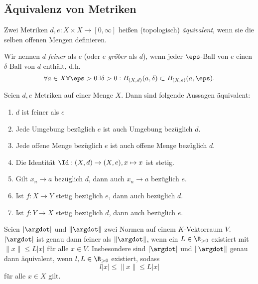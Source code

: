 \subsection{Äquivalenz von Metriken}

\begin{df}
	Zwei Metriken $d,e : X \times X \to [0, \infty]$ heißen (topologisch) \emph{äquivalent}, wenn sie die selben offenen Mengen definieren.

	Wir nennen $d$ \emph{feiner} als $e$ (oder $e$ \emph{gröber} als $d$), wenn jeder $\eps$-Ball von $e$ einen $\delta$-Ball von $d$ enthält, d.h.
	\[
		\forall a \in X \forall \eps > 0 \exists \delta > 0 : B_{(X,d)}(a, \delta) \subset B_{(X,e)}(a, \eps).
	\]
\end{df}

\begin{prop}
	Seien $d, e$ Metriken auf einer Menge $X$.
	Dann sind folgende Aussagen äquivalent:
	\begin{enumerate}[(1)]
		\item
			$d$ ist feiner als $e$
		\item
			Jede Umgebung bezüglich $e$ ist auch Umgebung bezüglich $d$.
		\item
			Jede offene Menge bezüglich $e$ ist auch offene Menge bezüglich $d$.
		\item
			Die Identität $\Id: (X,d) \to (X,e), x \mapsto x$ ist stetig.
		\item
			Gilt $x_n \to a$ bezüglich $d$, dann auch $x_n \to a$ bezüglich $e$.
		\item
			Ist $f: X \to Y$ stetig bezüglich $e$, dann auch bezüglich $d$.
		\item
			Ist $f: Y \to X$ stetig bezüglich $d$, dann auch bezüglich $e$.
	\end{enumerate}

	Seien $|\argdot|$ und $\|\argdot\|$ zwei Normen auf einem $K$-Vektorraum $V$.
	$|\argdot|$ ist genau dann feiner als $\|\argdot\|$, wenn ein $L \in \R_{>0}$ existiert mit $\|x\| \le L |x|$ für alle $x \in V$.
	Insbesondere sind $|\argdot|$ und $\|\argdot\|$ genau dann äquivalent, wenn $l,L \in \R_{>0}$ existiert, sodass
	\[
		l|x| \le \|x\| \le L|x|
	\]
	für alle $x \in X$ gilt.
\end{prop}

